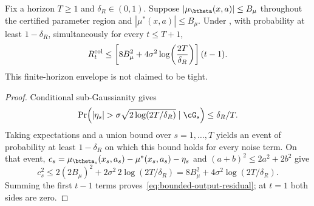 \begin{lemma}
\label{lem:bounded-output-residual}
Fix a horizon $T\ge1$ and $\delta_R\in(0,1)$.  Suppose
$|\mu_{\btheta}(x,a)|\le B_\mu$ throughout the certified parameter region and
$|\mu^*(x,a)|\le B_\mu$.  Under , with probability at least
$1-\delta_R$, simultaneously for every $t\le T+1$,
\begin{equation}\label{eq:bounded-output-residual}
 R_t^{\rm col}\le
 \left[8B_\mu^2+4\sigma^2\log\!\left(\frac{2T}{\delta_R}\right)\right](t-1).
\end{equation}
This finite-horizon envelope is not claimed to be tight.
\end{lemma}
\begin{proof}
Conditional sub-Gaussianity gives
\[
 \Pr\!\left(|\eta_s|>
 \sigma\sqrt{2\log(2T/\delta_R)}\mid\cG_s\right)
 \le\delta_R/T.
\]
Taking expectations and a union bound over $s=1,\ldots,T$ yields an event of
probability at least $1-\delta_R$ on which this bound holds for every noise
term.  On that event,
$c_s=\mu_{\btheta_s}(x_s,a_s)-\mu^*(x_s,a_s)-\eta_s$ and
$(a+b)^2\le2a^2+2b^2$ give
\[
 c_s^2\le
 2(2B_\mu)^2+2\sigma^2\,2\log(2T/\delta_R)
 =8B_\mu^2+4\sigma^2\log(2T/\delta_R).
\]
Summing the first $t-1$ terms proves~\eqref{eq:bounded-output-residual}; at
$t=1$ both sides are zero.
\end{proof}

